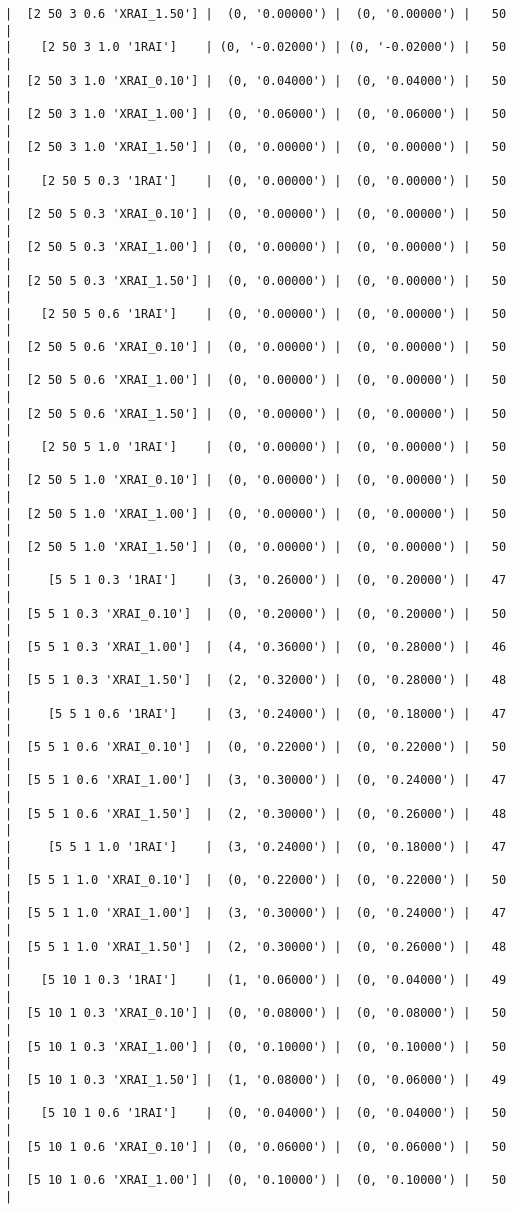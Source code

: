 \documentclass{article}
\begin{document}
\begin{verbatim}
|  [2 50 3 0.6 'XRAI_1.50'] |  (0, '0.00000') |  (0, '0.00000') |   50  |
|    [2 50 3 1.0 '1RAI']    | (0, '-0.02000') | (0, '-0.02000') |   50  |
|  [2 50 3 1.0 'XRAI_0.10'] |  (0, '0.04000') |  (0, '0.04000') |   50  |
|  [2 50 3 1.0 'XRAI_1.00'] |  (0, '0.06000') |  (0, '0.06000') |   50  |
|  [2 50 3 1.0 'XRAI_1.50'] |  (0, '0.00000') |  (0, '0.00000') |   50  |
|    [2 50 5 0.3 '1RAI']    |  (0, '0.00000') |  (0, '0.00000') |   50  |
|  [2 50 5 0.3 'XRAI_0.10'] |  (0, '0.00000') |  (0, '0.00000') |   50  |
|  [2 50 5 0.3 'XRAI_1.00'] |  (0, '0.00000') |  (0, '0.00000') |   50  |
|  [2 50 5 0.3 'XRAI_1.50'] |  (0, '0.00000') |  (0, '0.00000') |   50  |
|    [2 50 5 0.6 '1RAI']    |  (0, '0.00000') |  (0, '0.00000') |   50  |
|  [2 50 5 0.6 'XRAI_0.10'] |  (0, '0.00000') |  (0, '0.00000') |   50  |
|  [2 50 5 0.6 'XRAI_1.00'] |  (0, '0.00000') |  (0, '0.00000') |   50  |
|  [2 50 5 0.6 'XRAI_1.50'] |  (0, '0.00000') |  (0, '0.00000') |   50  |
|    [2 50 5 1.0 '1RAI']    |  (0, '0.00000') |  (0, '0.00000') |   50  |
|  [2 50 5 1.0 'XRAI_0.10'] |  (0, '0.00000') |  (0, '0.00000') |   50  |
|  [2 50 5 1.0 'XRAI_1.00'] |  (0, '0.00000') |  (0, '0.00000') |   50  |
|  [2 50 5 1.0 'XRAI_1.50'] |  (0, '0.00000') |  (0, '0.00000') |   50  |
|     [5 5 1 0.3 '1RAI']    |  (3, '0.26000') |  (0, '0.20000') |   47  |
|  [5 5 1 0.3 'XRAI_0.10']  |  (0, '0.20000') |  (0, '0.20000') |   50  |
|  [5 5 1 0.3 'XRAI_1.00']  |  (4, '0.36000') |  (0, '0.28000') |   46  |
|  [5 5 1 0.3 'XRAI_1.50']  |  (2, '0.32000') |  (0, '0.28000') |   48  |
|     [5 5 1 0.6 '1RAI']    |  (3, '0.24000') |  (0, '0.18000') |   47  |
|  [5 5 1 0.6 'XRAI_0.10']  |  (0, '0.22000') |  (0, '0.22000') |   50  |
|  [5 5 1 0.6 'XRAI_1.00']  |  (3, '0.30000') |  (0, '0.24000') |   47  |
|  [5 5 1 0.6 'XRAI_1.50']  |  (2, '0.30000') |  (0, '0.26000') |   48  |
|     [5 5 1 1.0 '1RAI']    |  (3, '0.24000') |  (0, '0.18000') |   47  |
|  [5 5 1 1.0 'XRAI_0.10']  |  (0, '0.22000') |  (0, '0.22000') |   50  |
|  [5 5 1 1.0 'XRAI_1.00']  |  (3, '0.30000') |  (0, '0.24000') |   47  |
|  [5 5 1 1.0 'XRAI_1.50']  |  (2, '0.30000') |  (0, '0.26000') |   48  |
|    [5 10 1 0.3 '1RAI']    |  (1, '0.06000') |  (0, '0.04000') |   49  |
|  [5 10 1 0.3 'XRAI_0.10'] |  (0, '0.08000') |  (0, '0.08000') |   50  |
|  [5 10 1 0.3 'XRAI_1.00'] |  (0, '0.10000') |  (0, '0.10000') |   50  |
|  [5 10 1 0.3 'XRAI_1.50'] |  (1, '0.08000') |  (0, '0.06000') |   49  |
|    [5 10 1 0.6 '1RAI']    |  (0, '0.04000') |  (0, '0.04000') |   50  |
|  [5 10 1 0.6 'XRAI_0.10'] |  (0, '0.06000') |  (0, '0.06000') |   50  |
|  [5 10 1 0.6 'XRAI_1.00'] |  (0, '0.10000') |  (0, '0.10000') |   50  |

\end{verbatim}
\end{document}
